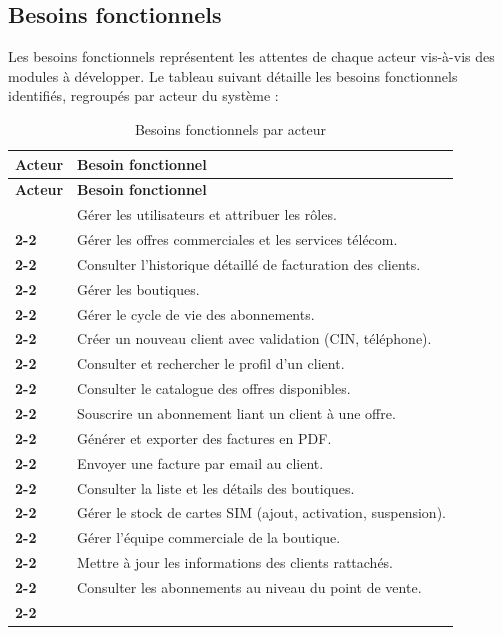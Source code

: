 \subsection{Besoins fonctionnels}
Les besoins fonctionnels représentent les attentes de chaque acteur vis-à-vis des modules à développer.\newline
Le tableau suivant détaille les besoins fonctionnels identifiés, regroupés par acteur du système :
\newpage
\vspace*{0.75cm}
\renewcommand{\arraystretch}{1.35}

\begin{longtable}{|>{\bfseries}p{4.3cm}|p{11.5cm}|}
    \hline
    \textbf{Acteur} & \textbf{Besoin fonctionnel} \\
    \hline
    \endfirsthead
    \hline
    \textbf{Acteur} & \textbf{Besoin fonctionnel} \\
    \hline
    \endhead
    \hline
    \endfoot
    
    \multirow{6}{*}{Administrateur} 
    & Gérer les utilisateurs et attribuer les rôles. \\ \cline{2-2}
    & Gérer les offres commerciales et les services télécom. \\ \cline{2-2}
    & Consulter l'historique détaillé de facturation des clients. \\ \cline{2-2}
    & Gérer les boutiques. \\ \cline{2-2}
    & Gérer le cycle de vie des abonnements. \\ \cline{2-2}
    \hline
    
    \multirow{6}{*}{Agent commercial}
    & Créer un nouveau client avec validation (CIN, téléphone). \\ \cline{2-2}
    & Consulter et rechercher le profil d'un client. \\ \cline{2-2}
    & Consulter le catalogue des offres disponibles. \\ \cline{2-2}
    & Souscrire un abonnement liant un client à une offre. \\ \cline{2-2}
    & Générer et exporter des factures en PDF. \\ \cline{2-2}
    & Envoyer une facture par email au client. \\ \cline{2-2}
    \hline
    
    \multirow{5}{3cm}{Responsable boutique}
    & Consulter la liste et les détails des boutiques. \\ \cline{2-2}
    & Gérer le stock de cartes SIM (ajout, activation, suspension). \\ \cline{2-2}
    & Gérer l'équipe commerciale de la boutique. \\ \cline{2-2}
    & Mettre à jour les informations des clients rattachés. \\ \cline{2-2}
    & Consulter les abonnements au niveau du point de vente. \\ \cline{2-2}
    \hline
    
    \caption{Besoins fonctionnels par acteur}
    \label{tab:besoins_fonctionnels}
\end{longtable}


